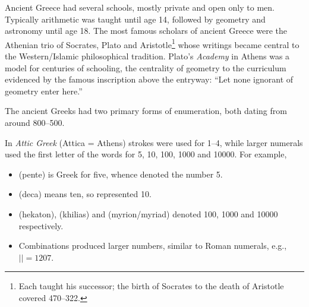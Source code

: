 Ancient Greece had several schools, mostly private and open only to men. %
Typically arithmetic was taught until age 14, followed by geometry  and astronomy until age 18. The most famous scholars of ancient Greece were the Athenian trio of Socrates, Plato and Aristotle\footnote{Each taught his successor; the birth of Socrates to the death of Aristotle covered 470--322\BC.} whose writings became central to the Western/Islamic  philosophical tradition. Plato's \emph{Academy} in Athens was a model for centuries of schooling, the centrality of geometry to the curriculum evidenced by the famous inscription above the entryway: ``Let none ignorant of geometry enter here.''



The ancient Greeks had two primary forms of enumeration, both dating from around 800--500\BC.\smallbreak

In \emph{Attic Greek} (Attica = Athens) strokes were used for 1--4, while larger numerals used the first letter of the words for 5, 10, 100, 1000 and 10000. For example,
\begin{itemize}\itemsep0pt
  \item {} (pente) is Greek for five, whence  denoted the number 5.
	\item {} (deca) means ten, so  represented 10.
	\item {} (hekaton),  (khilias) and  (myrion/myriad) denoted 100, 1000 and 10000 respectively.
	\item Combinations produced larger numbers, similar to Roman numerals, e.g., $||=1207$.
\end{itemize}


